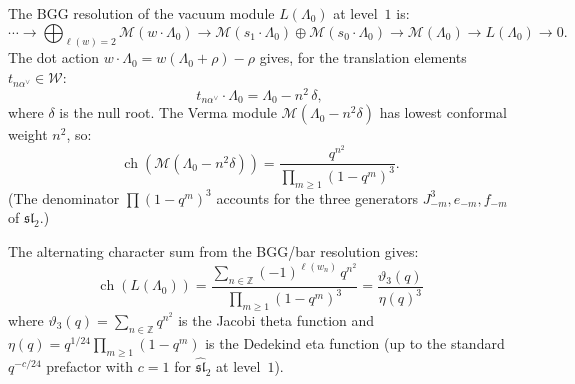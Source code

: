 \begin{proposition}
\label{prop:bgg-sl2-level1}
The BGG resolution of the vacuum module $L(\Lambda_0)$ at level~$1$ is:
\begin{equation}\label{eq:bgg-sl2-level1}
\cdots \to \bigoplus_{\ell(w)=2} \mathcal{M}(w \cdot \Lambda_0)
\to \mathcal{M}(s_1 \cdot \Lambda_0) \oplus \mathcal{M}(s_0 \cdot \Lambda_0)
\to \mathcal{M}(\Lambda_0) \to L(\Lambda_0) \to 0.
\end{equation}
The dot action $w \cdot \Lambda_0 = w(\Lambda_0 + \rho) - \rho$ gives,
for the translation elements $t_{n\alpha^\vee} \in \mathcal{W}$:
\begin{equation}\label{eq:dot-action-translations}
t_{n\alpha^\vee} \cdot \Lambda_0 = \Lambda_0 - n^2\,\delta,
\end{equation}
where $\delta$ is the null root.
The Verma module $\mathcal{M}(\Lambda_0 - n^2\delta)$ has lowest
conformal weight $n^2$, so:
\begin{equation}\label{eq:verma-character-sl2}
\operatorname{ch}(\mathcal{M}(\Lambda_0 - n^2\delta))
= \frac{q^{n^2}}{\prod_{m \geq 1}(1-q^m)^3}.
\end{equation}
(The denominator $\prod(1-q^m)^3$ accounts for the three
generators $J^3_{-m}, e_{-m}, f_{-m}$ of
$\widehat{\mathfrak{sl}}_2$.)
\end{proposition}

\begin{proposition}
\label{prop:weyl-kac-sl2-bar}
The alternating character sum from the BGG/bar resolution gives:
\begin{equation}\label{eq:weyl-kac-sl2}
\operatorname{ch}(L(\Lambda_0))
= \frac{\sum_{n \in \mathbb{Z}} (-1)^{\ell(w_n)}\,
  q^{n^2}}{\prod_{m \geq 1}(1-q^m)^3}
= \frac{\vartheta_3(q)}{\eta(q)^3}
\end{equation}
where $\vartheta_3(q) = \sum_{n \in \mathbb{Z}} q^{n^2}$ is the Jacobi
theta function and $\eta(q) = q^{1/24}\prod_{m \geq 1}(1-q^m)$ is the
Dedekind eta function \textup{(}up to the standard $q^{-c/24}$
prefactor with $c = 1$ for $\widehat{\mathfrak{sl}}_2$ at level~$1$\textup{)}.
\end{proposition}

